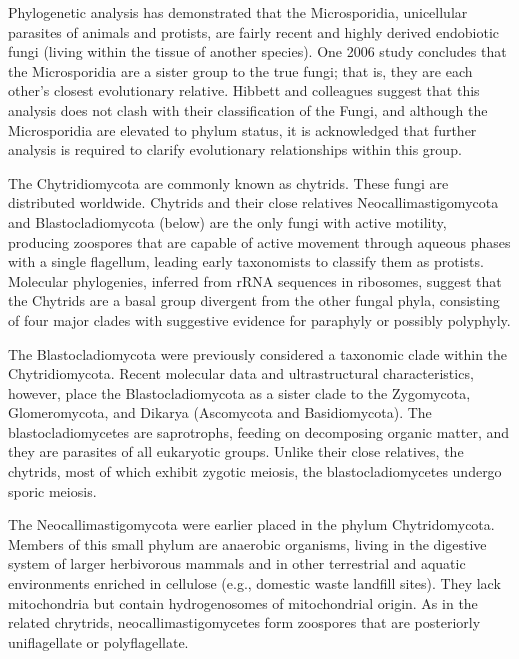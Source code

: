 Phylogenetic analysis has demonstrated that the Microsporidia, unicellular parasites of animals and protists, are fairly recent and highly derived endobiotic fungi (living within the tissue of another species). One 2006 study concludes that the Microsporidia are a sister group to the true fungi; that is, they are each other's closest evolutionary relative. Hibbett and colleagues suggest that this analysis does not clash with their classification of the Fungi, and although the Microsporidia are elevated to phylum status, it is acknowledged that further analysis is required to clarify evolutionary relationships within this group.

The Chytridiomycota are commonly known as chytrids. These fungi are distributed worldwide. Chytrids and their close relatives Neocallimastigomycota and Blastocladiomycota (below) are the only fungi with active motility, producing zoospores that are capable of active movement through aqueous phases with a single flagellum, leading early taxonomists to classify them as protists. Molecular phylogenies, inferred from rRNA sequences in ribosomes, suggest that the Chytrids are a basal group divergent from the other fungal phyla, consisting of four major clades with suggestive evidence for paraphyly or possibly polyphyly.

The Blastocladiomycota were previously considered a taxonomic clade within the Chytridiomycota. Recent molecular data and ultrastructural characteristics, however, place the Blastocladiomycota as a sister clade to the Zygomycota, Glomeromycota, and Dikarya (Ascomycota and Basidiomycota). The blastocladiomycetes are saprotrophs, feeding on decomposing organic matter, and they are parasites of all eukaryotic groups. Unlike their close relatives, the chytrids, most of which exhibit zygotic meiosis, the blastocladiomycetes undergo sporic meiosis.

The Neocallimastigomycota were earlier placed in the phylum Chytridomycota. Members of this small phylum are anaerobic organisms, living in the digestive system of larger herbivorous mammals and in other terrestrial and aquatic environments enriched in cellulose (e.g., domestic waste landfill sites). They lack mitochondria but contain hydrogenosomes of mitochondrial origin. As in the related chrytrids, neocallimastigomycetes form zoospores that are posteriorly uniflagellate or polyflagellate.


